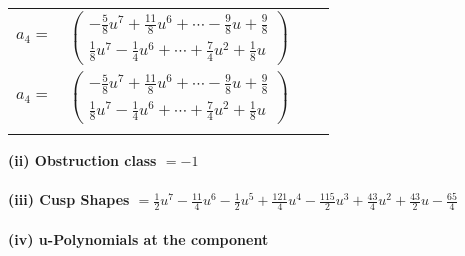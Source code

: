 \documentclass[1p]{elsarticle_modified}
\theoremstyle{definition}
\begin{document}
\begin{tabular}{m{7pt} m{180pt} m{7pt} m{180pt} }
\flushright $a_{4}=$&$\begin{pmatrix}-\frac{5}{8} u^7+\frac{11}{8} u^6+\cdots-\frac{9}{8} u+\frac{9}{8}\\\frac{1}{8} u^7-\frac{1}{4} u^6+\cdots+\frac{7}{4} u^2+\frac{1}{8} u\end{pmatrix}$\\ \flushright $a_{4}=$&$\begin{pmatrix}-\frac{5}{8} u^7+\frac{11}{8} u^6+\cdots-\frac{9}{8} u+\frac{9}{8}\\\frac{1}{8} u^7-\frac{1}{4} u^6+\cdots+\frac{7}{4} u^2+\frac{1}{8} u\end{pmatrix}$\\&\end{tabular}
\flushleft \textbf{(ii) Obstruction class $= -1$}\\~\\
\flushleft \textbf{(iii) Cusp Shapes $= \frac{1}{2} u^7-\frac{11}{4} u^6-\frac{1}{2} u^5+\frac{121}{4} u^4-\frac{115}{2} u^3+\frac{43}{4} u^2+\frac{43}{2} u-\frac{65}{4}$}\\~\\
\newpage\renewcommand{\arraystretch}{1}
\flushleft \textbf{(iv) u-Polynomials at the component}\newline \\
\end{document}
